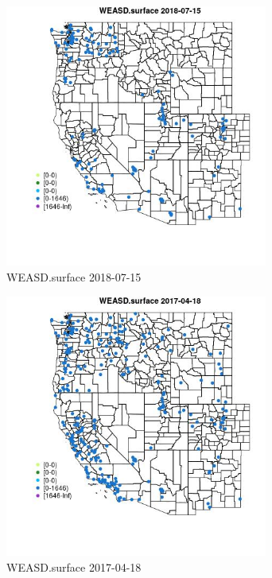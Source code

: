\begin{figure} 
\centering  
\includegraphics[width=0.77\textwidth]{Code_Outputs/Report_ML_input_PM25_Step4_part_e_de_duplicated_aves_compiled_2019-05-21wNAs_MapObsWEASDsurface2018-07-15.jpg} 
\caption{\label{fig:Report_ML_input_PM25_Step4_part_e_de_duplicated_aves_compiled_2019-05-21wNAsMapObsWEASDsurface2018-07-15}WEASD.surface 2018-07-15} 
\end{figure} 
 

\clearpage 

\begin{figure} 
\centering  
\includegraphics[width=0.77\textwidth]{Code_Outputs/Report_ML_input_PM25_Step4_part_e_de_duplicated_aves_compiled_2019-05-21wNAs_MapObsWEASDsurface2017-04-18.jpg} 
\caption{\label{fig:Report_ML_input_PM25_Step4_part_e_de_duplicated_aves_compiled_2019-05-21wNAsMapObsWEASDsurface2017-04-18}WEASD.surface 2017-04-18} 
\end{figure} 
 

